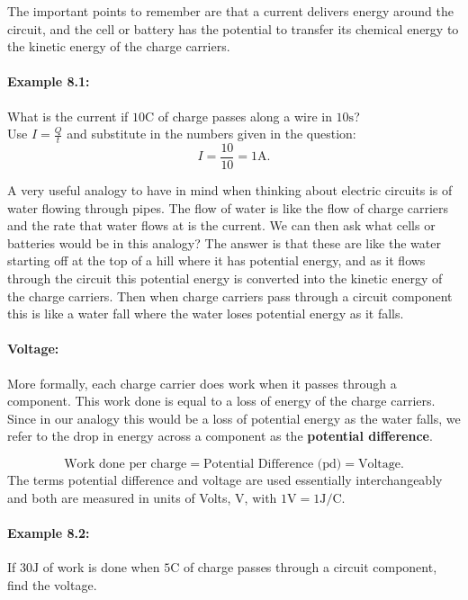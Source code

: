 \documentclass[a4paper,12pt]{book}
\begin{document}
The important points to remember are that a current delivers energy around the circuit, and the cell or battery has the potential to transfer its chemical energy to the kinetic energy of the charge carriers.

\paragraph{Example 8.1:}What is the current if $10\text{C}$ of charge passes along a wire in $10\text{s}$?\\

Use $I=\frac{Q}{t}$ and substitute in the numbers given in the question:
\begin{equation*}
I=\frac{10}{10}=1\text{A}.
\end{equation*}

A very useful analogy to have in mind when thinking about electric circuits is of water flowing through pipes. The flow of water is like the flow of charge carriers and the rate that water flows at is the current.  We can then ask what cells or batteries would be in this analogy? The answer is that these are like the water starting off at the top of a hill where it has potential energy, and as it flows through the circuit this potential energy is converted into the kinetic energy of the charge carriers. Then when charge carriers pass through a circuit component this is like a water fall where the water loses potential energy as it falls.\\


\paragraph{Voltage:} More formally, each charge carrier does work when it passes through a component. This work done is equal to a loss of energy of the charge carriers. Since in our analogy this would be a loss of potential energy as the water falls, we refer to the drop in energy across a component as the \textbf{potential difference}.

\begin{equation*}
\text{Work done per charge} = \text{Potential Difference (pd)} = \text{Voltage}.
\end{equation*}
The terms potential difference and voltage are used essentially interchangeably  and both are measured in units of Volts, $\text{V}$, with $1\text{V}=1\text{J/C}$. 

\paragraph{Example 8.2:} If $30\text{J}$ of work is done when $5\text{C}$ of charge passes through a circuit component, find the voltage.\\
\end{document}
